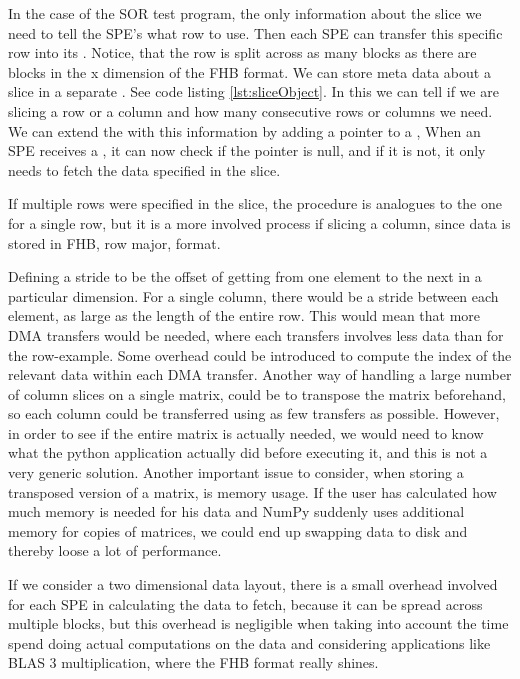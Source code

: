 In the case of the SOR test program, the only information about the
slice we need to tell the SPE's what row to use. Then each SPE can
transfer this specific row into its \LS{}. Notice, that the row is split
across as many blocks as there are blocks in the x dimension of the
FHB format. We can store meta data about a slice in a separate
. See code listing \ref{lst:sliceObject}. In this
 we can tell if we are slicing a row or a column and
how many consecutive rows or columns we need. We can extend the
 with this information by adding a pointer to a
, %
When an SPE receives a , it can now check if the
 pointer is null, and if it is not, it only needs to fetch
the data specified in the slice.

If multiple rows were specified in the slice, the procedure is
analogues to the one for a single row, but it is a more involved
process if slicing a column, since data is stored in FHB, row major,
format.

Defining a stride to be the offset of getting from one element to the
next in a particular dimension. For a single column, there would be a
stride between each element, as large as the length of the entire
row. This would mean that more DMA transfers would be needed, where
each transfers involves less data than for the row-example. Some
overhead could be introduced to compute the index of the relevant data
within each DMA transfer. Another way of handling a large number of
column slices on a single matrix, could be to transpose the matrix
beforehand, so each column could be transferred using as few transfers
as possible. However, in order to see if the entire matrix is
actually needed, we would need to know what the python application
actually did before executing it, and this is not a very generic
solution. Another important issue to consider, when storing a
transposed version of a matrix, is memory usage. If the user has
calculated how much memory is needed for his data and NumPy suddenly
uses additional memory for copies of matrices, we could end up
swapping data to disk and thereby loose a lot of performance.

If we consider a two dimensional data layout, there is a small overhead involved
for each SPE in calculating the data to fetch, because it can be
spread across multiple blocks, but this overhead is negligible when
taking into account the time spend doing actual computations on the
data and considering applications like BLAS 3 multiplication, where
the FHB format really shines.


